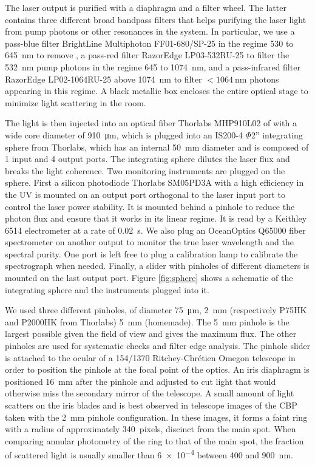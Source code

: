 The laser output is purified with a diaphragm and a filter wheel. The latter contains three different broad bandpass filters that helps purifying the laser light from pump photons or other resonances in the system. In particular, we use a pass-blue filter BrightLine Multiphoton FF01-680/SP-25 in the regime 530 to \SI{645}{\nano\meter} to remove , a pass-red filter RazorEdge LP03-532RU-25 to filter the \SI{532}{\nano\meter} pump photons in the regime 645 to \SI{1074}{\nano\meter}, and a pass-infrared filter RazorEdge LP02-1064RU-25 above \SI{1074}{\nano\meter} to filter $<\SI{1064}{\nano\meter}$ photons appearing in this regime. A black metallic box encloses the entire optical stage to minimize light scattering in the room.

The light is then injected into an optical fiber Thorlabs MHP910L02 of with a wide core diameter of \SI{910}{\micro\meter}, which is plugged into an IS200-4 $\Phi$2'' integrating sphere from Thorlabs, which has an internal \SI{50}{\mm} diameter and is composed of 1 input and 4 output ports. The integrating sphere dilutes the laser flux and breaks the light coherence. Two monitoring instruments are plugged on the sphere. First a silicon photodiode Thorlabs SM05PD3A with a high efficiency in the UV is mounted on an output port orthogonal to the laser input port to control the laser power stability. It is mounted behind a pinhole to reduce the photon flux and ensure that it works in its linear regime. It is read by a Keithley 6514 electrometer at a rate of \SI{0.02}{\second}. We also plug an OceanOptics Q65000 fiber spectrometer on another output to monitor the true laser wavelength and the spectral purity. One port is left free to plug a calibration lamp to calibrate the spectrograph when needed. Finally, a slider with pinholes of different diameters is mounted on the last output port. Figure \ref{fig:sphere} shows a schematic of the integrating sphere and the instruments plugged into it.

We used three different pinholes, of diameter \SI{75}{\micro\meter}, \SI{2}{\milli\meter} (respectively P75HK and P2000HK from Thorlabs) \SI{5}{\milli\meter} (homemade). The \SI{5}{\mm} pinhole is the largest possible given the \SD field of view and gives the maximum flux. The other pinholes are used for systematic checks and filter edge analysis. The pinhole slider is attached to the ocular of a 154/1370 Ritchey-Chrétien Omegon telescope in order to position the pinhole at the focal point of the optics. An iris diaphragm is positioned \SI{16}{mm} after the pinhole and adjusted to cut light that would otherwise miss the secondary mirror of the telescope. A small amount of light scatters on the iris blades and is best observed in telescope images of the CBP taken with the \SI{2}{mm} pinhole configuration. In these images, it forms a faint ring with a radius of approximately \SI{340}{pixels}, discinct from the main spot. When comparing annular photometry of the ring to that of the main spot, the fraction of scattered light is usually smaller than \num{6e-4} between 400 and \SI{900}{nm}.

